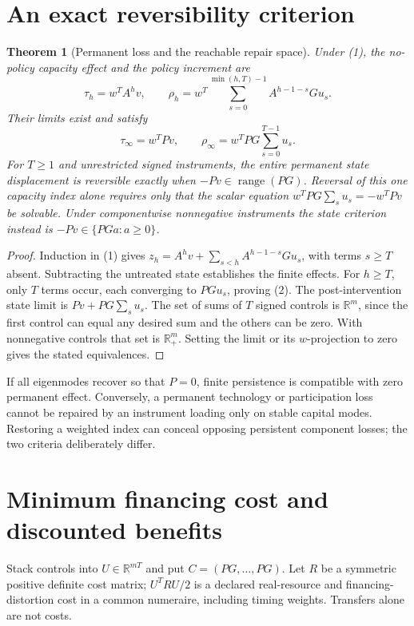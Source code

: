 \documentclass[11pt]{article}
\newtheorem{theorem}{Theorem}
\theoremstyle{remark}
\newcommand{\R}{\mathbb R}
\newcommand{\range}{\operatorname{range}}
\begin{document}
\section{An exact reversibility criterion}
\begin{theorem}[Permanent loss and the reachable repair space]
Under (1), the no-policy capacity effect and the policy increment are
\[
 \tau_h=w^TA^hv,\qquad
 \rho_h=w^T\sum_{s=0}^{\min(h,T)-1}A^{h-1-s}Gu_s.
\]
Their limits exist and satisfy
\[
 \tau_\infty=w^TPv,\qquad
 \rho_\infty=w^TPG\sum_{s=0}^{T-1}u_s.                                \tag{2}
\]
For $T\geq1$ and unrestricted signed instruments, the entire permanent state
displacement is reversible exactly when $-Pv\in\range(PG)$. Reversal of this
one capacity index alone requires only that the scalar equation
$w^TPG\sum_su_s=-w^TPv$ be solvable. Under componentwise nonnegative
instruments the state criterion instead is
$-Pv\in\{PGa:a\geq0\}$.
\end{theorem}
\begin{proof}
Induction in (1) gives
$z_h=A^hv+\sum_{s<h}A^{h-1-s}Gu_s$, with terms $s\geq T$ absent.
Subtracting the untreated state establishes the finite effects. For
$h\geq T$, only $T$ terms occur, each converging to $PGu_s$, proving
(2). The post-intervention state limit is
$Pv+PG\sum_su_s$. The set of sums of $T$ signed controls is $\R^m$,
since the first control can equal any desired sum and the others can be
zero. With nonnegative controls that set is $\R_+^m$. Setting the limit
or its $w$-projection to zero gives the stated equivalences.
\end{proof}
If all eigenmodes recover so that $P=0$, finite persistence is compatible
with zero permanent effect. Conversely, a permanent technology or
participation loss cannot be repaired by an instrument loading only on
stable capital modes. Restoring a weighted index can conceal opposing
persistent component losses; the two criteria deliberately differ.

\section{Minimum financing cost and discounted benefits}
Stack controls into $U\in\R^{mT}$ and put
$C=(PG,\ldots,PG)$. Let $R$ be a symmetric positive definite cost matrix;
$U^TRU/2$ is a declared real-resource and financing-distortion cost in a
common numeraire, including timing weights. Transfers alone are not costs.
\end{document}
